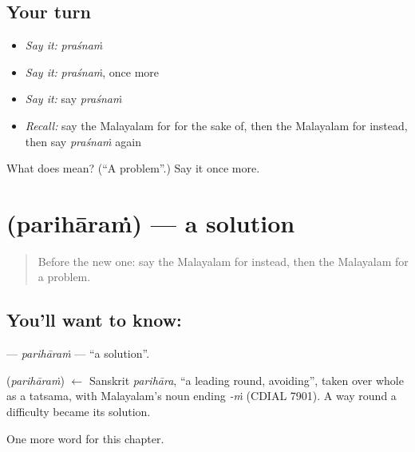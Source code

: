 \subsection*{Your turn}
\begin{itemize}
\raggedright
  \item \emph{Say it:} \emph{praśnaṁ}
  \item \emph{Say it:} \emph{praśnaṁ}, once more
  \item \emph{Say it:} say \emph{praśnaṁ}
  \item \emph{Recall:} say the Malayalam for for the sake of, then the Malayalam for instead, then say \emph{praśnaṁ} again
\end{itemize}

\begin{tcolorbox}[breakable,colback=teal!4,colframe=teal!35!black,title={Before you move on}]
What does  mean? (\textquotedblleft{}A problem\textquotedblright{}.) Say it once more.
\end{tcolorbox}
\section[\texorpdfstring{\ml{പരിഹാരം} (parihāraṁ)}{പരിഹാരം (parihāraṁ)}]{ (parihāraṁ) — a solution}

\label{lesson:ML-C200-pariharam}



\begin{quote}
Before the new one: say the Malayalam for instead, then the Malayalam for a problem.
\end{quote}

\subsection*{You'll want to know: }
\textbf{} — \emph{parihāraṁ} — \textquotedblleft{}a solution\textquotedblright{}.

\begin{cousinweb}
\textbf{} (\emph{parihāraṁ}) $\leftarrow$ Sanskrit \emph{parihāra}, \textquotedblleft{}a leading round, avoiding\textquotedblright{}, taken over whole as a tatsama, with Malayalam's noun ending \emph{-ṁ} (CDIAL 7901). A way round a difficulty became its solution.
\end{cousinweb}

\begin{grammarlens}[title={What you've built}]
One more word for this chapter.
\end{grammarlens}

